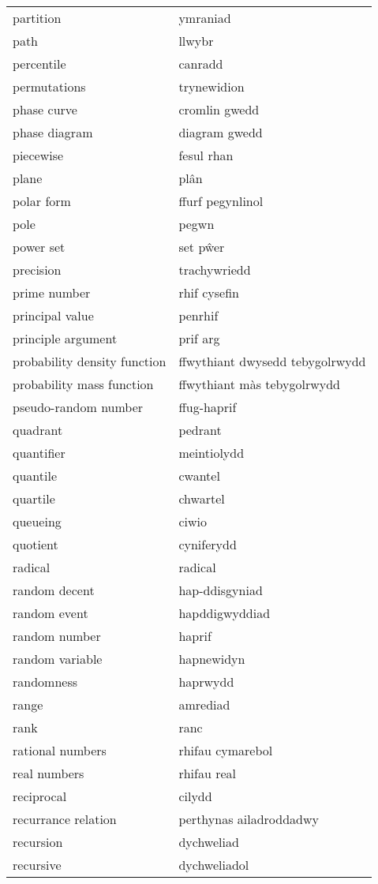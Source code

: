 \begin{supertabular}{p{0.22\textwidth}p{0.22\textwidth}}
partition & ymraniad \\
path & llwybr \\
percentile & canradd \\
permutations & trynewidion \\
phase curve & cromlin gwedd \\
phase diagram & diagram gwedd \\
piecewise & fesul rhan \\
plane & plân \\
polar form & ffurf pegynlinol \\
pole & pegwn \\
power set & set pŵer \\
precision & trachywriedd \\
prime number & rhif cysefin \\
principal value & penrhif \\
principle argument & prif arg \\
probability density function & ffwythiant dwysedd tebygolrwydd \\
probability mass function & ffwythiant màs tebygolrwydd \\
pseudo-random number & ffug-haprif \\
quadrant & pedrant \\
quantifier & meintiolydd \\
quantile & cwantel \\
quartile & chwartel \\
queueing & ciwio \\
quotient & cyniferydd \\
radical & radical \\
random decent & hap-ddisgyniad \\
random event & hapddigwyddiad \\
random number & haprif \\
random variable & hapnewidyn \\
randomness & haprwydd \\
range & amrediad \\
rank & ranc \\
rational numbers & rhifau cymarebol \\
real numbers & rhifau real \\
reciprocal & cilydd \\
recurrance relation & perthynas ailadroddadwy \\
recursion & dychweliad \\
recursive & dychweliadol \\

\end{supertabular}
